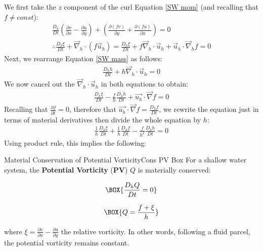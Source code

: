 We first take the $z$ component of the curl Equation \ref{SW mom} (and recalling that $f\neq const$):
\begin{align*}
    \frac{D_h}{Dt}\left( \frac{\partial v}{\partial x}- \frac{\partial u}{\partial y}\right) + \left( \frac{\partial (fv)}{\partial y} + \frac{\partial (fu)}{\partial x}\right) = 0
    \\
    \therefore \frac{D_h \xi}{Dt} + \vec{\nabla}_h \cdot \left( f\vec{u}_h \right)= \frac{D_h \xi}{Dt} + f\vec{\nabla}_h \cdot\vec{u}_h + \vec{u}_h \cdot \vec{\nabla}_h f = 0
\end{align*}
Next, we rearrange Equation \ref{SW mass} as follows:
\begin{align*}
    \frac{D_h h}{Dt}+h\vec{\nabla}_h \cdot \vec{u}_h=0
\end{align*}
We now cancel out the $\vec{\nabla}_h\cdot \vec{u}_h$ in both equations to obtain:
\begin{align*}
    \frac{D_h \xi}{Dt} - \frac{f}{h}\frac{D_h h}{Dt} + \vec{u_h}\cdot\vec{\nabla}f = 0
\end{align*}
Recalling that $\frac{\partial f}{\partial t}=0$, therefore that $\vec{u_h}\cdot\vec{\nabla}f=\frac{D_h f}{Dt}$, we rewrite the equation just in terms of material derivatives then divide the whole equation by $h$:
\begin{align*}
    \frac{1}{h}\frac{D_h \xi}{Dt} +\frac{1}{h}\frac{D_h f}{Dt} - \frac{f}{h^2}\frac{D_h h}{Dt}=0
\end{align*}
Using product rule, this implies the following:

\begin{fact}{Material Conservation of Potential Vorticity}{Cons PV Box}\label{Cons PV Box}
    For a shallow water system, the \textbf{Potential Vorticity} (\textbf{PV}) $Q$ is materially conserved: 

    \begin{minipage}{.48\linewidth}
        \begin{align}
        \label{SW Cons PV}
        \BOX{
            \frac{D_h Q}{Dt}=0
        }
    \end{align}
    \end{minipage}
    \begin{minipage}{.48\linewidth}
        \begin{align}
        \BOX{
            Q = \frac{f+\xi}{h}
        }
    \end{align}
    \end{minipage}
    
    \vspace{2mm} where $\xi=\frac{\partial v}{\partial x}-\frac{\partial u}{\partial y}$ the relative vorticity. In other words, following a fluid parcel, the potential vorticity remains constant.
\end{fact}

